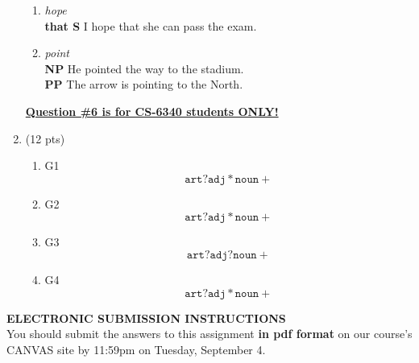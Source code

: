 \documentclass[11pt]{article}
\begin{document}
\begin{enumerate}
\begin{enumerate}
\item {\it hope}\\
\textbf{that S} I hope that she can pass the exam.

\item {\it point}\\
\textbf{NP} He pointed the way to the stadium.\\
\textbf{PP} The arrow is pointing to the North.

\end{enumerate}


\newpage
\underline{\textbf{Question \#6 is for CS-6340 students ONLY!}}  \\

\item (12 pts) 

\begin{enumerate}

\item G1 
$$\texttt{art}?\texttt{adj}*\texttt{noun}+$$
\vspace*{.2in}

\item G2
$$\texttt{art}?\texttt{adj}*\texttt{noun}+$$
\vspace*{.2in}

\item G3
$$\texttt{art}?\texttt{adj}?\texttt{noun}+$$
\vspace*{.2in}

\item G4
$$\texttt{art}?\texttt{adj}*\texttt{noun}+$$
\vspace*{.2in}

\end{enumerate}


\end{enumerate}  %

\newpage
\hspace*{1.5in}  {\bf ELECTRONIC SUBMISSION INSTRUCTIONS} \\

You should submit the answers to this assignment {\bf in pdf format}
on our course's CANVAS site by 11:59pm on Tuesday, September 4.
\end{document}
